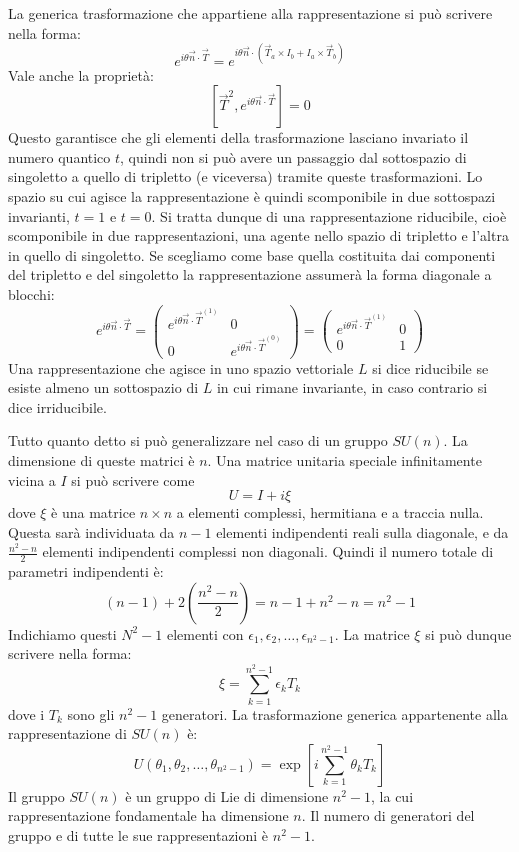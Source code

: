 La generica trasformazione che appartiene alla rappresentazione si può scrivere nella forma:
\[
e^{i\theta\vec{n}\cdot\vec{T}}=e^{i\theta\vec{n}\cdot(\vec{T}_a\times I_b+I_a\times\vec{T}_b)}
\]
Vale anche la proprietà:
\[
[\vec{T}^2,e^{i\theta\vec{n}\cdot\vec{T}}]=0
\]
Questo garantisce che gli elementi della trasformazione lasciano invariato il numero quantico $t$, quindi non si
può avere un passaggio dal sottospazio di singoletto a quello di tripletto (e viceversa) tramite queste
trasformazioni.
Lo spazio su cui agisce la rappresentazione è quindi scomponibile in due sottospazi invarianti, $t=1$ e $t=0$.
Si tratta dunque di una rappresentazione riducibile, cioè scomponibile in due rappresentazioni, una agente nello
spazio di tripletto e l'altra in quello di singoletto.
Se scegliamo come base quella costituita dai componenti del tripletto e del singoletto la rappresentazione
assumerà la forma diagonale a blocchi:
\[
e^{i\theta\vec{n}\cdot\vec{T}}=
\begin{pmatrix}
e^{i\theta\vec{n}\cdot\vec{T}^{(1)}} & 0\\
0 & e^{i\theta\vec{n}\cdot\vec{T}^{(0)}}
\end{pmatrix}
=
\begin{pmatrix}
e^{i\theta\vec{n}\cdot\vec{T}^{(1)}} & 0\\
0 & 1
\end{pmatrix}
\]
Una rappresentazione che agisce in uno spazio vettoriale $L$ si dice riducibile se esiste almeno un sottospazio di
$L$ in cui rimane invariante, in caso contrario si dice irriducibile.

Tutto quanto detto si può generalizzare nel caso di un gruppo $SU(n)$.
La dimensione di queste matrici è $n$. Una matrice unitaria speciale infinitamente vicina a $I$ si può scrivere come
\[
U=I+i\xi
\]
dove $\xi$ è una matrice $n\times n$ a elementi complessi, hermitiana e a traccia nulla. Questa sarà individuata da
$n-1$ elementi indipendenti reali sulla diagonale, e da $\frac{n^2-n}{2}$ elementi indipendenti complessi non
diagonali.
Quindi il numero totale di parametri indipendenti è:
\[
(n-1)+2(\frac{n^2-n}{2})=n-1+n^2-n=n^2-1
\]
Indichiamo questi $N^2-1$ elementi con $\epsilon_1,\epsilon_2,\dots,\epsilon_{n^2-1}$.
La matrice $\xi$ si può dunque scrivere nella forma:
\begin{equation}
\xi=\sum_{k=1}^{n^2-1}\epsilon_kT_k
\end{equation}
dove i $T_k$ sono gli $n^2-1$ generatori.
La trasformazione generica appartenente alla rappresentazione di $SU(n)$ è:
\begin{equation}
U(\theta_1,\theta_2,\dots,\theta_{n^2-1})=\exp[i\sum_{k=1}^{n^2-1}\theta_kT_k]
\end{equation}
Il gruppo $SU(n)$ è un gruppo di Lie di dimensione $n^2-1$, la cui rappresentazione fondamentale ha
dimensione $n$.
Il numero di generatori del gruppo e di tutte le sue rappresentazioni è $n^2-1$.

